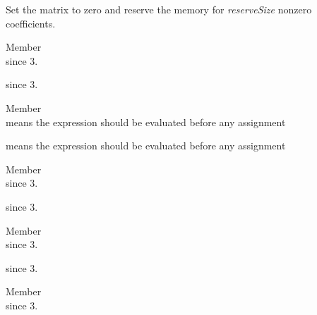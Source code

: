 \begin{DoxyRefList}
\label{deprecated__deprecated000081}%
%
 Set the matrix to zero and reserve the memory for {\itshape reserve\+Size} nonzero coefficients.  
\item[Member \doxylink{classEigen_1_1EigenSolver_a5bff6a6bc0efac67d52c60c2c3deb9ee}{Eigen\+::Eigen\+Solver\texorpdfstring{$<$}{<} \+\_\+\+Matrix\+Type \texorpdfstring{$>$}{>}\+::Index} ]\hfill \\
\label{deprecated__deprecated000016}%
%
since  3. 

\label{deprecated__deprecated000058}%
%
since  3.  
\item[Member \doxylink{group__flags_ga0972b20dc004d13984e642b3bd12532e}{Eigen\+::Eval\+Before\+Assigning\+Bit} ]\hfill \\
\label{deprecated__deprecated000010}%
%
 means the expression should be evaluated before any assignment 

\label{deprecated__deprecated000052}%
%
 means the expression should be evaluated before any assignment  
\item[Member \doxylink{classEigen_1_1GeneralizedEigenSolver_a46a0ff3841059479ec314e56a5645302}{Eigen\+::Generalized\+Eigen\+Solver\texorpdfstring{$<$}{<} \+\_\+\+Matrix\+Type \texorpdfstring{$>$}{>}\+::Index} ]\hfill \\
\label{deprecated__deprecated000017}%
%
since  3. 

\label{deprecated__deprecated000059}%
%
since  3.  
\item[Member \doxylink{classEigen_1_1HessenbergDecomposition_a8e287ac222f53e2c8ce82faa43e95ac6}{Eigen\+::Hessenberg\+Decomposition\texorpdfstring{$<$}{<} \+\_\+\+Matrix\+Type \texorpdfstring{$>$}{>}\+::Index} ]\hfill \\
\label{deprecated__deprecated000018}%
%
since  3. 

\label{deprecated__deprecated000060}%
%
since  3.  
\item[Member \doxylink{classEigen_1_1Hyperplane_a58d2307d16128a0026021374e9e10465}{Eigen\+::Hyperplane\texorpdfstring{$<$}{<} \+\_\+\+Scalar, \+\_\+\+Ambient\+Dim, \+\_\+\+Options \texorpdfstring{$>$}{>}\+::Index} ]\hfill \\
\label{deprecated__deprecated000026}%
%
since  3. 


\end{DoxyRefList}
